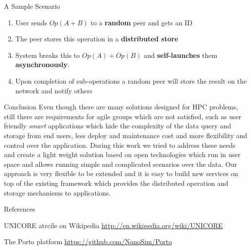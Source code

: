 \documentclass[final,hyperref={pdfpagelabels=true}]{beamer}
\begin{document}
\begin{frame}
\begin{columns}[t]
\begin{column}{.45\textwidth}
      \begin{block}{A Sample Scenario}
      \begin{enumerate}
      \item User sends \(Op(A + B) \) to a \textbf{random} peer and gets an ID
      \item The peer stores this operation in a \textbf{distributed store}
      \item System breaks this to \(Op(A) + Op(B) \) and \textbf{self-launches} them \textbf{asynchronously}.
      \item Upon completion of sub-operations a random peer will store the result on the network and notify others
      \end{enumerate}
      \end{block}
	  \begin{block}{Conclusion}
	  Even though there are many solutions designed for HPC problems, still there are requirements for agile groups which are not satisfied, such as user friendly \textit{smart} applications which hide the complexity
	  of the data query and storage from end users, less deploy and maintenance cost and more flexibility and control over the application.
	  During this work we tried to address these needs and create a light weight
	  solution based on open technologies which run in user space and allows running simple and complicated scenarios over the data. Our approach is very flexible to be extended and it is easy to build new services on top
	  of the existing framework which provides the distributed operation and storage mechanisms to applications.
	  \end{block}
      \begin{block}{References}
        \begin{thebibliography}{999}
        UNICORE atrcile on Wikipedia
        \url{http://en.wikipedia.org/wiki/UNICORE}
        
        The Porto platform
        \url{https://github.com/NanoSim/Porto}
%          
          

\end{thebibliography}
\end{block}
\end{column}
\end{columns}
\end{frame}
\end{document}

